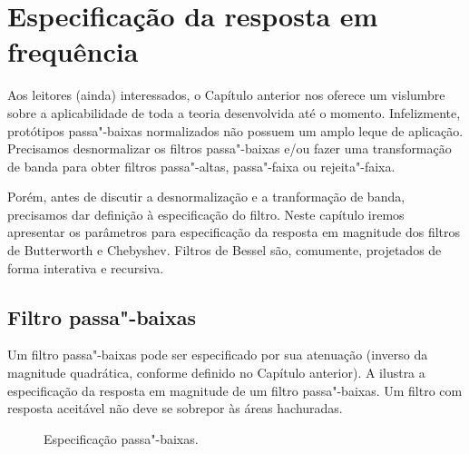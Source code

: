 \chapter[Especificação]{Especificação da resposta em frequência}

Aos leitores (ainda) interessados, o Capítulo anterior nos oferece um vislumbre sobre a aplicabilidade de toda a teoria desenvolvida até o momento. Infelizmente, protótipos passa"-baixas normalizados não possuem um amplo leque de aplicação. Precisamos desnormalizar os filtros passa"-baixas e\slash ou fazer uma transformação de banda para obter filtros passa"-altas, passa"-faixa ou rejeita"-faixa.

Porém, antes de discutir a desnormalização e a tranformação de banda, precisamos dar definição à especificação do filtro. Neste capítulo iremos apresentar os parâmetros para especificação da resposta em magnitude dos filtros de Butterworth e Chebyshev. Filtros de Bessel são, comumente, projetados de forma interativa e recursiva.

\section{Filtro passa"-baixas}

Um filtro passa"-baixas pode ser especificado por sua atenuação (inverso da magnitude quadrática, conforme definido no Capítulo anterior). A  ilustra a especificação da resposta em magnitude de um filtro passa"-baixas. Um filtro com resposta aceitável não deve se sobrepor às áreas hachuradas.

\begin{figure}[ht]
\centering
{}
\caption{Especificação passa"-baixas.}
\label{fig:pb}
\end{figure}

